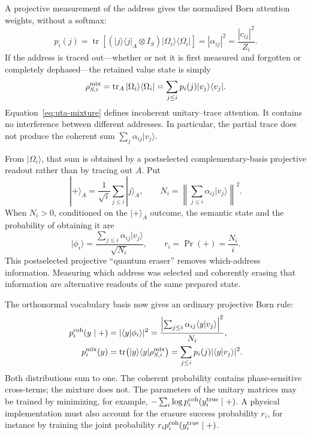 \documentclass[
  aps,
  reprint,
  superscriptaddress,
  floatfix,
  nofootinbib,
  longbibliography
]{revtex4-2}
\begin{document}
A projective measurement of the address gives the normalized Born attention
weights, without a softmax:
\begin{equation}
 p_i(j)
 =\operatorname{tr}\!\left[
 (|j\rangle\langle j|_A\otimes I_S)
 |\Omega_i\rangle\langle\Omega_i|
 \right]
 =|\alpha_{ij}|^2
 =\frac{|c_{ij}|^2}{Z_i}.
\label{eq:uta-address}
\end{equation}
If the address is traced out---whether or not it is first measured and
forgotten or completely dephased---the retained value state is simply
\begin{equation}
 \rho_{S,i}^{\rm mix}
 =\operatorname{tr}_A|\Omega_i\rangle\langle\Omega_i|
 =\sum_{j\leq i}p_i(j)|v_j\rangle\langle v_j|.
\label{eq:uta-mixture}
\end{equation}
Equation~\eqref{eq:uta-mixture} defines incoherent unitary--trace attention.
It contains no interference between different addresses.  In
particular, the partial trace does not produce the coherent sum
$\sum_j\alpha_{ij}|v_j\rangle$.

From $|\Omega_i\rangle$, that sum is obtained by a postselected
complementary-basis projective readout rather than by tracing out $A$.  Put
\begin{equation}
 |+\rangle_A=\frac{1}{\sqrt{i}}\sum_{j\leq i}|j\rangle_A,\qquad
 N_i=\left\|\sum_{j\leq i}\alpha_{ij}|v_j\rangle\right\|^2 .
\label{eq:uta-erasure}
\end{equation}
When $N_i>0$, conditioned on the $|+\rangle_A$ outcome, the semantic state and the
probability of obtaining it are
\begin{equation}
 |\phi_i\rangle
 =\frac{\sum_{j\leq i}\alpha_{ij}|v_j\rangle}{\sqrt{N_i}},
 \qquad
 r_i=\Pr(+)=\frac{N_i}{i}.
\label{eq:uta-coherent}
\end{equation}
This postselected projective ``quantum eraser'' removes which-address information.
Measuring which address was selected and coherently erasing that information
are alternative readouts of the same prepared state.

The orthonormal vocabulary basis now gives an ordinary projective Born rule:
\begin{equation}
\begin{aligned}
 p_i^{\rm coh}(y\mid +)
 &=|\langle y|\phi_i\rangle|^2
 =\frac{\left|\sum_{j\leq i}
       \alpha_{ij}\langle y|v_j\rangle\right|^2}{N_i},\\
 p_i^{\rm mix}(y)
 &=\operatorname{tr}\!\left(
 |y\rangle\langle y|\rho_{S,i}^{\rm mix}\right)
 =\sum_{j\leq i}p_i(j)|\langle y|v_j\rangle|^2 .
\end{aligned}
\label{eq:uta-vocabulary}
\end{equation}
Both distributions sum to one.  The coherent probability contains
phase-sensitive cross-terms; the mixture does not.  The parameters of the
unitary matrices may be trained by minimizing, for example,
$-\sum_i\log p_i^{\rm coh}(y_i^{\rm true}\mid +)$.  A physical implementation
must also account for the erasure success probability $r_i$, for instance by
training the joint probability $r_i p_i^{\rm coh}(y_i^{\rm true}\mid +)$.
\end{document}

